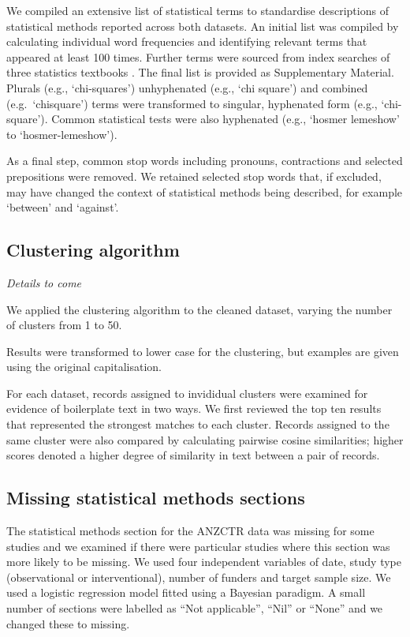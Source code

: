 \documentclass[12pt]{article}
\begin{document}
We compiled an extensive list of statistical terms to standardise
descriptions of statistical methods reported across both datasets. An
initial list was compiled by calculating individual word frequencies and
identifying relevant terms that appeared at least 100 times. Further
terms were sourced from index searches of three statistics textbooks
\citep[\citet{Diggle2013},\citet{Bland2015}]{Dobson2018}. The final list
is provided as Supplementary Material. Plurals (e.g., `chi-squares')
unhyphenated (e.g., `chi square') and combined (e.g.~`chisquare') terms
were transformed to singular, hyphenated form (e.g., `chi-square').
Common statistical tests were also hyphenated (e.g., `hosmer lemeshow'
to `hosmer-lemeshow').

As a final step, common stop words including pronouns, contractions and
selected prepositions were removed. We retained selected stop words
that, if excluded, may have changed the context of statistical methods
being described, for example `between' and `against'.

\subsection{Clustering algorithm}

\emph{Details to come}

We applied the clustering algorithm to the cleaned dataset, varying the
number of clusters from 1 to 50.

Results were transformed to lower case for the clustering, but examples
are given using the original capitalisation.

For each dataset, records assigned to invididual clusters were examined
for evidence of boilerplate text in two ways. We first reviewed the top
ten results that represented the strongest matches to each cluster.
Records assigned to the same cluster were also compared by calculating
pairwise cosine similarities; higher scores denoted a higher degree of
similarity in text between a pair of records.

\subsection{Missing statistical methods sections}

The statistical methods section for the ANZCTR data was missing for some
studies and we examined if there were particular studies where this
section was more likely to be missing. We used four independent
variables of date, study type (observational or interventional), number
of funders and target sample size. We used a logistic regression model
fitted using a Bayesian paradigm. A small number of sections were
labelled as ``Not applicable'', ``Nil'' or ``None'' and we changed these
to missing.
\end{document}
